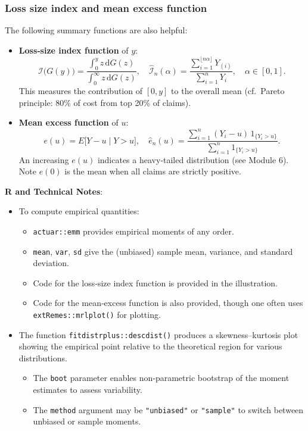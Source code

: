 \documentclass[11pt]{article}
\newcommand{\noi}{\noindent}
\begin{document}
\subsubsection*{Loss size index and mean excess function}
\noi The following summary functions are also helpful:
\begin{itemize}
  \item \textbf{Loss‐size index function} of \(y\):
    \[
      \mathcal I\bigl(G(y)\bigr)
      = \frac{\displaystyle\int_{0}^{y} z\,\mathrm{d}G(z)}
             {\displaystyle\int_{0}^{\infty} z\,\mathrm{d}G(z)},
      \quad
      \widehat{\mathcal I}_n(\alpha)
      = \frac{\sum_{i=1}^{\lfloor n\alpha\rfloor}Y_{(i)}}
             {\sum_{i=1}^{n}Y_i},
      \quad \alpha\in[0,1].
    \]
    This measures the contribution of \([0,y]\) to the overall mean (cf.\ Pareto principle: 80\% of cost from top 20\% of claims).
  \item \textbf{Mean excess function} of \(u\):
    \[
      e(u) = E\bigl[Y - u \mid Y>u\bigr],
      \quad
      \widehat e_n(u)
      = \frac{\sum_{i=1}^n (Y_i - u)\,1_{\{Y_i>u\}}}
             {\sum_{i=1}^n 1_{\{Y_i>u\}}}.
    \]
    An increasing \(e(u)\) indicates a heavy‐tailed distribution (see Module 6).  Note \(e(0)\) is the mean when all claims are strictly positive.
\end{itemize} \phantom{i}

\noi \textbf{R and Technical Notes}: \\
\begin{itemize}
  \item To compute empirical quantities:
    \begin{itemize}
      \item \texttt{actuar::emm} provides empirical moments of any order.
      \item \texttt{mean}, \texttt{var}, \texttt{sd} give the (unbiased) sample mean, variance, and standard deviation.
      \item Code for the loss‐size index function is provided in the illustration.
      \item Code for the mean‐excess function is also provided, though one often uses \texttt{extRemes::mrlplot()} for plotting.
    \end{itemize}
  \item The function \texttt{fitdistrplus::descdist()} produces a skewness–kurtosis plot showing the empirical point relative to the theoretical region for various distributions.
    \begin{itemize}
      \item The \texttt{boot} parameter enables non‐parametric bootstrap of the moment estimates to assess variability.
      \item The \texttt{method} argument may be \texttt{"unbiased"} or \texttt{"sample"} to switch between unbiased or sample moments.
    \end{itemize}
\end{itemize}
\end{document}
